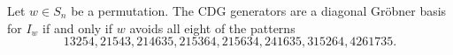 \begin{conjecture}\cite[Conjecture 7.1]{HPW}\label{conj:mainresult}
Let $w \in S_n$ be a permutation. The CDG generators are a diagonal Gr\"obner basis for $I_w$ if and only if $w$ avoids all eight of the patterns \[
13254, 21543, 214635, 215364, 215634, 241635, 315264, 4261735.
\]
\end{conjecture}
